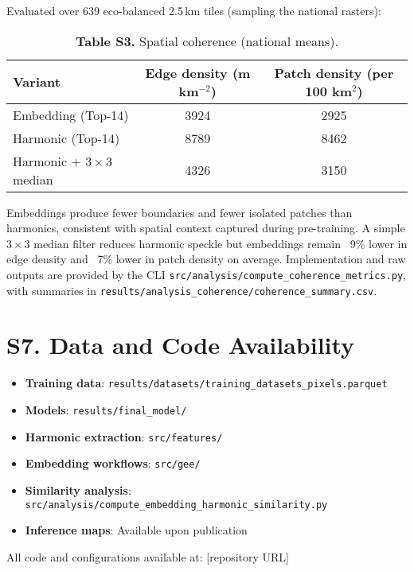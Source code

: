 \documentclass[utf8]{frontiers_suppmat}
\begin{document}
Evaluated over 639 eco-balanced 2.5\,km tiles (sampling the national rasters):

\begin{table}[H]
    \centering
    \caption{\textbf{Table S3.} Spatial coherence (national means).}
    \begin{tabular}{lcc}
        \hline
        \textbf{Variant} & \textbf{Edge density (m km$^{-2}$)} & \textbf{Patch density (per 100 km$^{2}$)} \\ \hline
        Embedding (Top-14) & 3924 & 2925 \\
        Harmonic (Top-14) & 8789 & 8462 \\
        Harmonic + 3\,$\times$\,3 median & 4326 & 3150 \\ \hline
    \end{tabular}
\end{table}

Embeddings produce fewer boundaries and fewer isolated patches than harmonics, consistent with spatial context captured during pre-training. A simple 3\,$\times$\,3 median filter reduces harmonic speckle but embeddings remain ~9\% lower in edge density and ~7\% lower in patch density on average. Implementation and raw outputs are provided by the CLI \texttt{src/analysis/compute\_coherence\_metrics.py}, with summaries in \texttt{results/analysis\_coherence/coherence\_summary.csv}.

\section{S7. Data and Code Availability}

\begin{itemize}
    \item \textbf{Training data}: \texttt{results/datasets/training\_datasets\_pixels.parquet}
    \item \textbf{Models}: \texttt{results/final\_model/}
    \item \textbf{Harmonic extraction}: \texttt{src/features/}
    \item \textbf{Embedding workflows}: \texttt{src/gee/}
    \item \textbf{Similarity analysis}: \texttt{src/analysis/compute\_embedding\_harmonic\_similarity.py}
    \item \textbf{Inference maps}: Available upon publication
\end{itemize}

All code and configurations available at: [repository URL]
\end{document}
